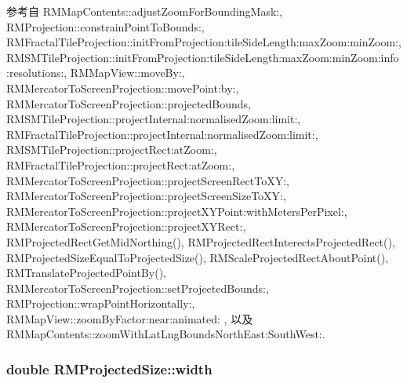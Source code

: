 参考自 R\-M\-Map\-Contents\-::adjust\-Zoom\-For\-Bounding\-Mask\-:, R\-M\-Projection\-::constrain\-Point\-To\-Bounds\-:, R\-M\-Fractal\-Tile\-Projection\-::init\-From\-Projection\-:tile\-Side\-Length\-:max\-Zoom\-:min\-Zoom\-:, R\-M\-S\-M\-Tile\-Projection\-::init\-From\-Projection\-:tile\-Side\-Length\-:max\-Zoom\-:min\-Zoom\-:info\-:resolutions\-:, R\-M\-Map\-View\-::move\-By\-:, R\-M\-Mercator\-To\-Screen\-Projection\-::move\-Point\-:by\-:, R\-M\-Mercator\-To\-Screen\-Projection\-::projected\-Bounds, R\-M\-S\-M\-Tile\-Projection\-::project\-Internal\-:normalised\-Zoom\-:limit\-:, R\-M\-Fractal\-Tile\-Projection\-::project\-Internal\-:normalised\-Zoom\-:limit\-:, R\-M\-S\-M\-Tile\-Projection\-::project\-Rect\-:at\-Zoom\-:, R\-M\-Fractal\-Tile\-Projection\-::project\-Rect\-:at\-Zoom\-:, R\-M\-Mercator\-To\-Screen\-Projection\-::project\-Screen\-Rect\-To\-X\-Y\-:, R\-M\-Mercator\-To\-Screen\-Projection\-::project\-Screen\-Size\-To\-X\-Y\-:, R\-M\-Mercator\-To\-Screen\-Projection\-::project\-X\-Y\-Point\-:with\-Meters\-Per\-Pixel\-:, R\-M\-Mercator\-To\-Screen\-Projection\-::project\-X\-Y\-Rect\-:, R\-M\-Projected\-Rect\-Get\-Mid\-Northing(), R\-M\-Projected\-Rect\-Interects\-Projected\-Rect(), R\-M\-Projected\-Size\-Equal\-To\-Projected\-Size(), R\-M\-Scale\-Projected\-Rect\-About\-Point(), R\-M\-Translate\-Projected\-Point\-By(), R\-M\-Mercator\-To\-Screen\-Projection\-::set\-Projected\-Bounds\-:, R\-M\-Projection\-::wrap\-Point\-Horizontally\-:, R\-M\-Map\-View\-::zoom\-By\-Factor\-:near\-:animated\-: , 以及 R\-M\-Map\-Contents\-::zoom\-With\-Lat\-Lng\-Bounds\-North\-East\-:\-South\-West\-:.

\hypertarget{struct_r_m_projected_size_ab2d82f0c01ef95a523287018dd6966f5}{
\subsubsection[{width}]{\setlength{\rightskip}{0pt plus 5cm}double R\-M\-Projected\-Size\-::width}}\label{struct_r_m_projected_size_ab2d82f0c01ef95a523287018dd6966f5}


